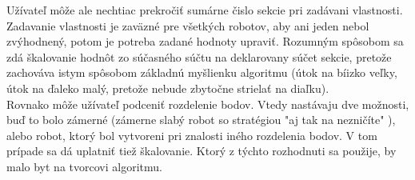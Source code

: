 Užívateľ môže ale nechtiac prekročiť sumárne čislo sekcie pri zadávani vlastnosti. Zadavanie vlastnosti je zaväzné pre všetkých robotov, aby ani jeden nebol zvýhodnený, potom je potreba zadané hodnoty upraviť. Rozumným spôsobom sa zdá škalovanie hodnôt zo súčasného súčtu na deklarovany súčet sekcie, pretože zachováva istym spôsobom základnú myšlienku algoritmu (útok na bíizko veľky, útok na ďaleko malý, pretože nebude zbytočne strielať na diaľku).\\

Rovnako môže užívateľ podceniť rozdelenie bodov. Vtedy nastávaju dve možnosti, buď to bolo zámerné (zámerne slabý robot so stratégiou "aj tak na nezničíte" ), alebo robot, ktorý bol vytvoreni pri znalosti iného rozdelenia bodov. V tom prípade sa dá uplatniť tiež škalovanie. Ktorý z týchto rozhodnuti sa použije, by malo byt na tvorcovi algoritmu.\\

